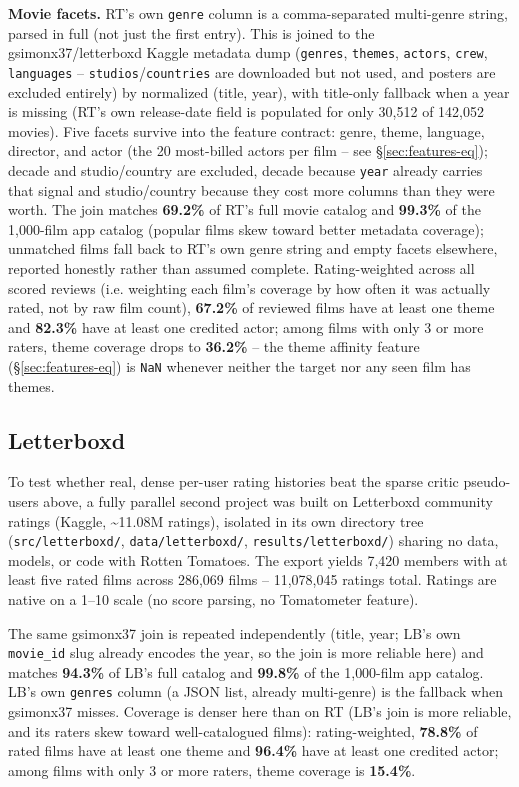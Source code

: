 \documentclass[11pt]{article}
\begin{document}
\textbf{Movie facets.} RT's own \texttt{genre} column is a comma-separated multi-genre string, parsed in full (not just the first entry). This is joined to the gsimonx37/letterboxd Kaggle metadata dump (\texttt{genres}, \texttt{themes}, \texttt{actors}, \texttt{crew}, \texttt{languages} -- \texttt{studios}/\texttt{countries} are downloaded but not used, and posters are excluded entirely) by normalized (title, year), with title-only fallback when a year is missing (RT's own release-date field is populated for only 30{,}512 of 142{,}052 movies). Five facets survive into the feature contract: genre, theme, language, director, and actor (the 20 most-billed actors per film -- see \S\ref{sec:features-eq}); decade and studio/country are excluded, decade because \texttt{year} already carries that signal and studio/country because they cost more columns than they were worth. The join matches \textbf{69.2\%} of RT's full movie catalog and \textbf{99.3\%} of the 1{,}000-film app catalog (popular films skew toward better metadata coverage); unmatched films fall back to RT's own genre string and empty facets elsewhere, reported honestly rather than assumed complete. Rating-weighted across all scored reviews (i.e. weighting each film's coverage by how often it was actually rated, not by raw film count), \textbf{67.2\%} of reviewed films have at least one theme and \textbf{82.3\%} have at least one credited actor; among films with only 3 or more raters, theme coverage drops to \textbf{36.2\%} -- the theme affinity feature (\S\ref{sec:features-eq}) is \texttt{NaN} whenever neither the target nor any seen film has themes.

\subsection{Letterboxd}
\label{sec:data-lb}

To test whether real, dense per-user rating histories beat the sparse critic pseudo-users above, a fully parallel second project was built on Letterboxd community ratings (Kaggle, \textasciitilde11.08M ratings), isolated in its own directory tree (\texttt{src/letterboxd/}, \texttt{data/letterboxd/}, \texttt{results/letterboxd/}) sharing no data, models, or code with Rotten Tomatoes. The export yields 7{,}420 members with at least five rated films across 286{,}069 films -- 11{,}078{,}045 ratings total. Ratings are native on a 1--10 scale (no score parsing, no Tomatometer feature).

The same gsimonx37 join is repeated independently (title, year; LB's own \texttt{movie\_id} slug already encodes the year, so the join is more reliable here) and matches \textbf{94.3\%} of LB's full catalog and \textbf{99.8\%} of the 1{,}000-film app catalog. LB's own \texttt{genres} column (a JSON list, already multi-genre) is the fallback when gsimonx37 misses. Coverage is denser here than on RT (LB's join is more reliable, and its raters skew toward well-catalogued films): rating-weighted, \textbf{78.8\%} of rated films have at least one theme and \textbf{96.4\%} have at least one credited actor; among films with only 3 or more raters, theme coverage is \textbf{15.4\%}.
\end{document}
